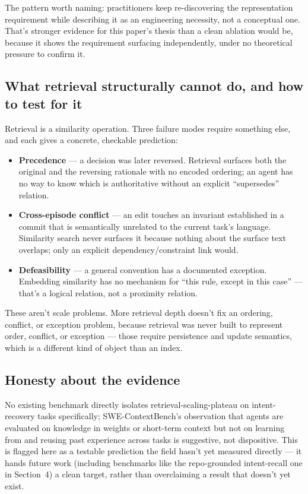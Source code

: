 \documentclass[11pt]{article}
\begin{document}
The pattern worth naming: practitioners keep re-discovering the representation requirement while describing it as an engineering necessity, not a conceptual one. That's stronger evidence for this paper's thesis than a clean ablation would be, because it shows the requirement surfacing independently, under no theoretical pressure to confirm it.

\subsection{What retrieval structurally cannot do, and how to test for it}

Retrieval is a similarity operation. Three failure modes require something else, and each gives a concrete, checkable prediction:

\begin{itemize}[leftmargin=*]
  \item \textbf{Precedence} --- a decision was later reversed. Retrieval surfaces both the original and the reversing rationale with no encoded ordering; an agent has no way to know which is authoritative without an explicit ``supersedes'' relation.
  \item \textbf{Cross-episode conflict} --- an edit touches an invariant established in a commit that is semantically unrelated to the current task's language. Similarity search never surfaces it because nothing about the surface text overlaps; only an explicit dependency/constraint link would.
  \item \textbf{Defeasibility} --- a general convention has a documented exception. Embedding similarity has no mechanism for ``this rule, except in this case'' --- that's a logical relation, not a proximity relation.
\end{itemize}

These aren't scale problems. More retrieval depth doesn't fix an ordering, conflict, or exception problem, because retrieval was never built to represent order, conflict, or exception --- those require persistence and update semantics, which is a different kind of object than an index.

\subsection{Honesty about the evidence}

No existing benchmark directly isolates retrieval-scaling-plateau on intent-recovery tasks specifically; SWE-ContextBench's observation that agents are evaluated on knowledge in weights or short-term context but not on learning from and reusing past experience across tasks \citep{zhu2026swecontextbench} is suggestive, not dispositive. This is flagged here as a testable prediction the field hasn't yet measured directly --- it hands future work (including benchmarks like the repo-grounded intent-recall one in Section~4) a clean target, rather than overclaiming a result that doesn't yet exist.
\end{document}
